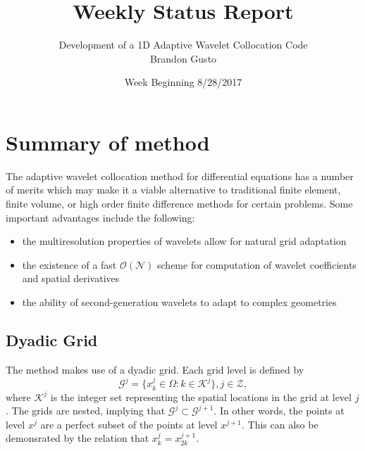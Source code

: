 \documentclass[11pt]{article}
\begin{document}
\title{Weekly Status Report}
\author{Development of a 1D Adaptive Wavelet Collocation Code \\
Brandon Gusto \\}
\date{Week Beginning 8/28/2017}

\maketitle
%
\section{Summary of method}
The adaptive wavelet collocation method for differential equations has a number of merits which may make it a viable
alternative to traditional finite element, finite volume, or high order finite difference methods for certain problems. 
Some important advantages include the following:
\begin{itemize}
    \item the multiresolution properties of wavelets allow for natural grid adaptation
    \item the existence of a fast $\mathcal{O}(\mathcal{N})$ scheme for computation of wavelet coefficients and 
          spatial derivatives
    \item the ability of second-generation wavelets to adapt to complex geometries
\end{itemize}
\subsection{Dyadic Grid}
The method makes use of a dyadic grid. Each grid level is defined by 
\begin{equation}
    \mathcal{G}^j= \{ x_{k}^{j} \in \Omega : k \in \mathcal{K}^j \}, j \in \mathcal{Z},
\end{equation}
where $\mathcal{K}^j$ is the integer set representing the spatial locations in the grid at level $j$. The grids are 
nested, implying that $\mathcal{G}^{j} \subset \mathcal{G}^{j+1}$. In other words, the points at level $x^{j}$ are 
a perfect subset of the points at level $x^{j+1}$. This can also be demonsrated by the relation that 
$x_{k}^{j}=x_{2k}^{j+1}$.
\end{document}
